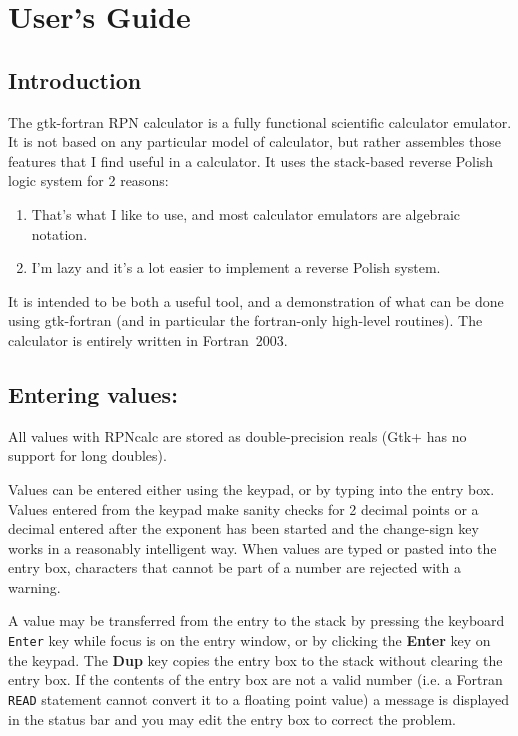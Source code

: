 \documentclass{article}
\begin{document}
  \section{User's Guide}

  \subsection{Introduction}

  The gtk-fortran RPN calculator is a fully functional scientific
  calculator emulator. It is not based on any particular model of
  calculator, but rather assembles those features that I find useful in
  a calculator. It uses the stack-based reverse Polish logic system for
  2 reasons:
  \begin{enumerate}
  \item That's what I like to use, and most calculator emulators are
    algebraic notation.
  \item I'm lazy and it's a lot easier to implement a reverse Polish
    system.
  \end{enumerate}

  It is intended to be both a useful tool, and a demonstration of what
  can be done using gtk-fortran (and in particular the fortran-only
  high-level routines). The calculator is entirely written in
  Fortran~2003.

  \subsection{Entering values:}

  All values with RPNcalc are stored as double-precision reals (Gtk+
  has no support for long doubles).

  Values can be entered either using the keypad, or by typing into the
  entry box. Values entered from the keypad make sanity checks for 2
  decimal points or a decimal entered after the exponent has been
  started and the change-sign key works in a reasonably intelligent
  way. When values are typed or pasted into the entry box, characters
  that cannot be part of a number are rejected with a warning.

  A value may be transferred from the entry to the stack by pressing
  the keyboard \texttt{Enter} key while focus is on the entry window,
  or by clicking the \textbf{Enter} key on the keypad. The \textbf{Dup}
  key copies the entry box to the stack without clearing the entry
  box. If the contents of the entry box are not a valid number (i.e. a
  Fortran \texttt{READ} statement cannot convert it to a floating point
  value) a message is displayed in the status bar and you may edit the
  entry box to correct the problem.
\end{document}
